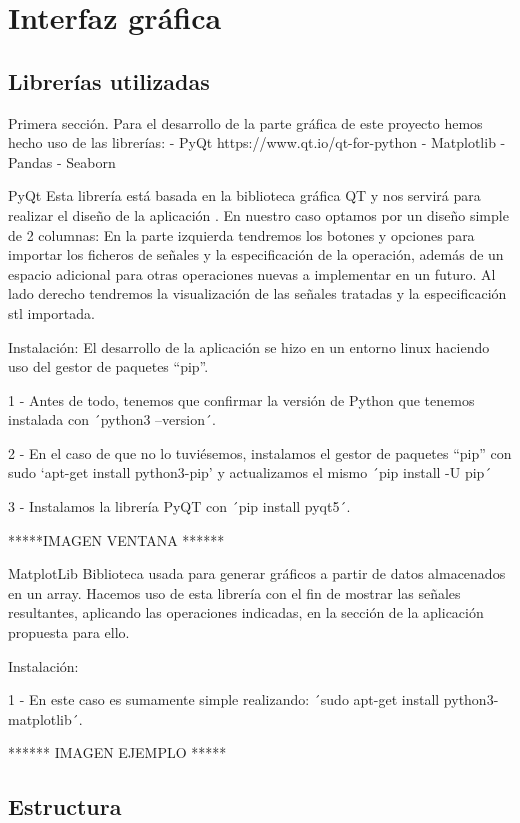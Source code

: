 \chapter{Interfaz gráfica}
\label{cha:gui}
 
\section{Librerías utilizadas}
Primera sección.
Para el desarrollo de la parte gráfica de este proyecto hemos hecho uso de las librerías:
- PyQt https://www.qt.io/qt-for-python
- Matplotlib
- Pandas
- Seaborn 
 
PyQt
Esta librería está basada en la biblioteca gráfica QT y nos servirá para realizar el diseño de la aplicación    . En nuestro caso optamos por un diseño simple de 2 columnas: En la parte izquierda tendremos los botones y opciones para importar los ficheros de señales y la especificación de la operación, además de un espacio adicional para otras operaciones nuevas a implementar en un futuro. Al lado derecho tendremos la visualización de las señales tratadas y la especificación stl importada.
 
Instalación: 
El desarrollo de la aplicación se hizo en un entorno linux haciendo uso del gestor de paquetes “pip”. 
 
1 - Antes de todo, tenemos que confirmar la versión de Python que tenemos instalada con ´python3 --version´.
 
2 - En el caso de que no lo tuviésemos, instalamos el gestor de paquetes “pip” con sudo ‘apt-get install python3-pip’ y actualizamos el mismo ´pip install -U pip´ 
 
3 - Instalamos la librería PyQT con ´pip install pyqt5´. 
 
*****IMAGEN VENTANA ****** 
 
MatplotLib
Biblioteca usada para generar gráficos a partir de datos almacenados en un array. Hacemos uso de esta librería con el fin de mostrar las señales resultantes, aplicando las operaciones indicadas, en la sección de la aplicación propuesta para ello. 
 
Instalación: 
 
1 - En este caso es sumamente simple realizando: ´sudo apt-get install python3-matplotlib´.
 
****** IMAGEN EJEMPLO *****
 
 
\section{Estructura}
 
